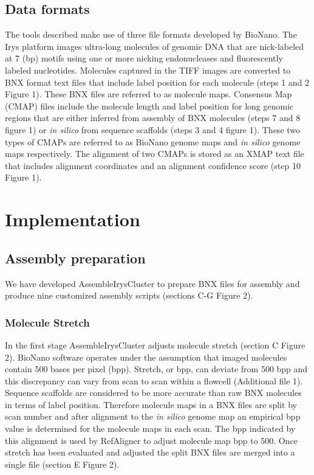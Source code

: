\documentclass{bmcart}
\begin{document}
\subsection*{Data formats}
The tools described make use of three file formats developed by BioNano. The Irys platform images ultra-long molecules of genomic DNA that are nick-labeled at 7 (bp) motifs using one or more nicking endonucleases and fluorescently labeled nucleotides. Molecules captured in the TIFF images are converted to BNX format text files that include label position for each molecule (steps 1 and 2 Figure 1). These BNX files are referred to as molecule maps. Consensus Map (CMAP) files include the molecule length and label position for long genomic regions that are either inferred from assembly of BNX molecules (steps 7 and 8 figure 1) or \textit{in silico} from sequence scaffolds (steps 3 and 4 figure 1). These two types of CMAPs are referred to as BioNano genome maps and \textit{in silico} genome maps respectively. The alignment of two CMAPs is stored as an XMAP text file that includes alignment coordinates and an alignment confidence score (step 10 Figure 1).

\section*{Implementation}
\subsection*{Assembly preparation}
We have developed AssembleIrysCluster to prepare BNX files for assembly and produce nine customized assembly scripts (sections C-G Figure 2).
\subsubsection*{Molecule Stretch}
In the first stage AssembleIrysCluster adjusts molecule stretch (section C Figure 2). BioNano software operates under the assumption that imaged molecules contain 500 bases per pixel (bpp). Stretch, or bpp, can deviate from 500 bpp and this discrepancy can vary from scan to scan within a flowcell (Additional file 1). Sequence scaffolds are considered to be more accurate than raw BNX molecules in terms of label position. Therefore molecule maps in a BNX files are split by scan number and after alignment to the \textit{in silico} genome map an empirical bpp value is determined for the molecule maps in each scan. The bpp indicated by this alignment is used by RefAligner to adjust molecule map bpp to 500. Once stretch has been evaluated and adjusted the split BNX files are merged into a single file (section E Figure 2).
\end{document}
